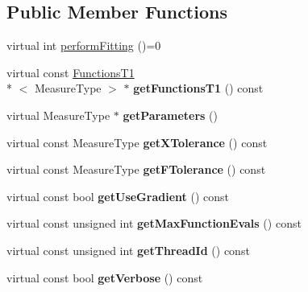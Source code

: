 \subsection*{Public Member Functions}
\begin{DoxyCompactItemize}
\item 
virtual int \hyperlink{class_ox_1_1_fitter_a8f240f0da86d06b339ab2747e87f21b9}{perform\-Fitting} ()=0
\item 
\hypertarget{class_ox_1_1_fitter_a859dc8c25c99b37f47d41e086b97c897}{virtual const \hyperlink{class_ox_1_1_functions_t1}{Functions\-T1}\\*
$<$ Measure\-Type $>$ $\ast$ {\bfseries get\-Functions\-T1} () const }\label{class_ox_1_1_fitter_a859dc8c25c99b37f47d41e086b97c897}

\item 
\hypertarget{class_ox_1_1_fitter_a5e87dd37738745f98d904865f6b89219}{virtual Measure\-Type $\ast$ {\bfseries get\-Parameters} ()}\label{class_ox_1_1_fitter_a5e87dd37738745f98d904865f6b89219}

\item 
\hypertarget{class_ox_1_1_fitter_a21f92547f664c9b6f3fa8da4c7d16965}{virtual const Measure\-Type {\bfseries get\-X\-Tolerance} () const }\label{class_ox_1_1_fitter_a21f92547f664c9b6f3fa8da4c7d16965}

\item 
\hypertarget{class_ox_1_1_fitter_ac62bf275718aafc95b5e49d0aa9fc1ef}{virtual const Measure\-Type {\bfseries get\-F\-Tolerance} () const }\label{class_ox_1_1_fitter_ac62bf275718aafc95b5e49d0aa9fc1ef}

\item 
\hypertarget{class_ox_1_1_fitter_aba3fc8ad5260390faf59e2f904ab6d6d}{virtual const bool {\bfseries get\-Use\-Gradient} () const }\label{class_ox_1_1_fitter_aba3fc8ad5260390faf59e2f904ab6d6d}

\item 
\hypertarget{class_ox_1_1_fitter_a04f36e075f86c6a89df833d17b9f029d}{virtual const unsigned int {\bfseries get\-Max\-Function\-Evals} () const }\label{class_ox_1_1_fitter_a04f36e075f86c6a89df833d17b9f029d}

\item 
\hypertarget{class_ox_1_1_fitter_a68e317f1c05ea2aa24f9d4803ee19215}{virtual const unsigned int {\bfseries get\-Thread\-Id} () const }\label{class_ox_1_1_fitter_a68e317f1c05ea2aa24f9d4803ee19215}

\item 
\hypertarget{class_ox_1_1_fitter_afeba16a2218db1f3fc646e2dde75f386}{virtual const bool {\bfseries get\-Verbose} () const }\label{class_ox_1_1_fitter_afeba16a2218db1f3fc646e2dde75f386}


\end{DoxyCompactItemize}

